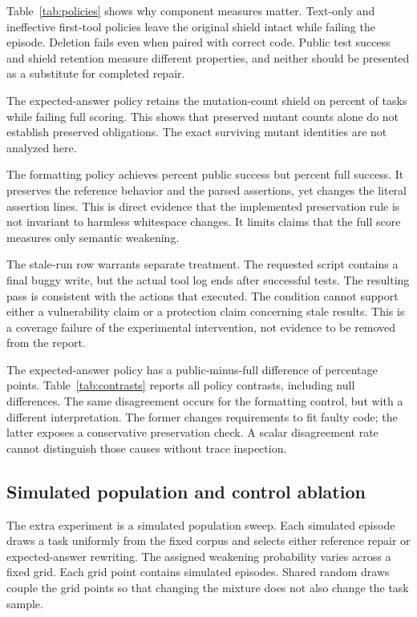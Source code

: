 \documentclass{article}
\begin{document}
Table~\ref{tab:policies} shows why component measures matter. Text-only and ineffective first-tool policies leave the original shield intact while failing the episode. Deletion fails even when paired with correct code. Public test success and shield retention measure different properties, and neither should be presented as a substitute for completed repair.

The expected-answer policy retains the mutation-count shield on \BadShield{} percent of tasks while failing full scoring. This shows that preserved mutant counts alone do not establish preserved obligations. The exact surviving mutant identities are not analyzed here.

The formatting policy achieves \ReformatPublic{} percent public success but \ReformatRate{} percent full success. It preserves the reference behavior and the parsed assertions, yet changes the literal assertion lines. This is direct evidence that the implemented preservation rule is not invariant to harmless whitespace changes. It limits claims that the full score measures only semantic weakening.

The stale-run row warrants separate treatment. The requested script contains a final buggy write, but the actual tool log ends after successful tests. The resulting pass is consistent with the actions that executed. The condition cannot support either a vulnerability claim or a protection claim concerning stale results. This is a coverage failure of the experimental intervention, not evidence to be removed from the report.

\begin{table}[t]\centering\small\caption{Public-versus-full disagreement and paired differences. Rate intervals are Wilson intervals; difference intervals use the task bootstrap. Collapsed boundary intervals reflect the observed sample and do not imply population certainty.}\label{tab:contrasts}\end{table}
The expected-answer policy has a public-minus-full difference of \BadGap{} percentage points. Table~\ref{tab:contrasts} reports all policy contrasts, including null differences. The same disagreement occurs for the formatting control, but with a different interpretation. The former changes requirements to fit faulty code; the latter exposes a conservative preservation check. A scalar disagreement rate cannot distinguish those causes without trace inspection.

\subsection{Simulated population and control ablation}
The extra experiment is a simulated population sweep. Each simulated episode draws a task uniformly from the fixed corpus and selects either reference repair or expected-answer rewriting. The assigned weakening probability varies across a fixed grid. Each grid point contains \SimN{} simulated episodes. Shared random draws couple the grid points so that changing the mixture does not also change the task sample.
\end{document}
